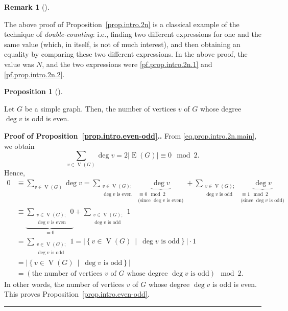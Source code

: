 \documentclass[numbers=enddot,12pt,final,onecolumn,notitlepage]{scrartcl}%
\theoremstyle{definition}
\newtheorem{prop}[theo]{Proposition}
\newenvironment{proposition}[1][]
{\begin{prop}[#1]\begin{leftbar}}
{\end{leftbar}\end{prop}}
\newtheorem{remk}[theo]{Remark}
\newenvironment{remark}[1][]
{\begin{remk}[#1]\begin{leftbar}}
{\end{leftbar}\end{remk}}
\newenvironment{proof}[1][Proof]{\noindent\textbf{#1.} }{\ \rule{0.5em}{0.5em}}
\let\sumnonlimits\sum
\renewcommand{\sum}{\sumnonlimits\limits}
\newcommand{\set}[1]{\left\{ #1 \right\}}
\newcommand{\abs}[1]{\left| #1 \right|}
\newcommand{\verts}[1]{\operatorname{V}\left( #1 \right)}
\newcommand{\edges}[1]{\operatorname{E}\left( #1 \right)}
\newcommand{\underbrack}[2]{\underbrace{#1}_{\substack{#2}}}
\begin{document}
\begin{remark}
The above proof of Proposition~\ref{prop.intro.2n} is a classical
example of the technique of \textit{double-counting}: i.e., finding
two different expressions for one and the same value (which, in
itself, is not of much interest), and then obtaining an equality by
comparing these two different expressions. In the above proof,
the value was $N$, and the two expressions were
\eqref{pf.prop.intro.2n.1} and \eqref{pf.prop.intro.2n.2}.
\end{remark}

\begin{proposition} \label{prop.intro.even-odd}
Let $G$ be a simple graph.
Then, the number of vertices $v$ of $G$ whose degree $\deg v$ is odd
is even.
\end{proposition}

\begin{proof}[Proof of Proposition~\ref{prop.intro.even-odd}.]
From \eqref{eq.prop.intro.2n.main}, we obtain
\[
\sum_{v \in \verts{G}} \deg v = 2 \abs{\edges{G}} \equiv 0 \mod 2.
\]
Hence,
\begin{align*}
0 &\equiv \sum_{v \in \verts{G}} \deg v
=
\sum_{\substack{v \in \verts{G}; \\ \deg v \text{ is even}}}
  \underbrack{\deg v}{\equiv 0 \mod 2 \\
                      \text{(since } \deg v \text{ is even)}}
+
\sum_{\substack{v \in \verts{G}; \\ \deg v \text{ is odd}}}
  \underbrack{\deg v}{\equiv 1 \mod 2 \\
                      \text{(since } \deg v \text{ is odd)}} \\
&\equiv
\underbrace{\sum_{\substack{v \in \verts{G}; \\ \deg v
            \text{ is even}}} 0}_{= 0}
+
\sum_{\substack{v \in \verts{G}; \\ \deg v \text{ is odd}}} 1 \\
&= \sum_{\substack{v \in \verts{G}; \\ \deg v \text{ is odd}}} 1
= \abs{\set{v \in \verts{G} \ \mid \ \deg v \text{ is odd}}} \cdot 1
\\
&= \abs{\set{v \in \verts{G} \ \mid \ \deg v \text{ is odd}}} \\
&= \left(\text{the number of vertices } v \text{ of } G
            \text{ whose degree } \deg v \text{ is odd}\right)
\mod 2 .
\end{align*}
In other words, the number of vertices $v$ of $G$ whose degree
$\deg v$ is odd is even. This proves
Proposition~\ref{prop.intro.even-odd}.
\end{proof}
\end{document}

